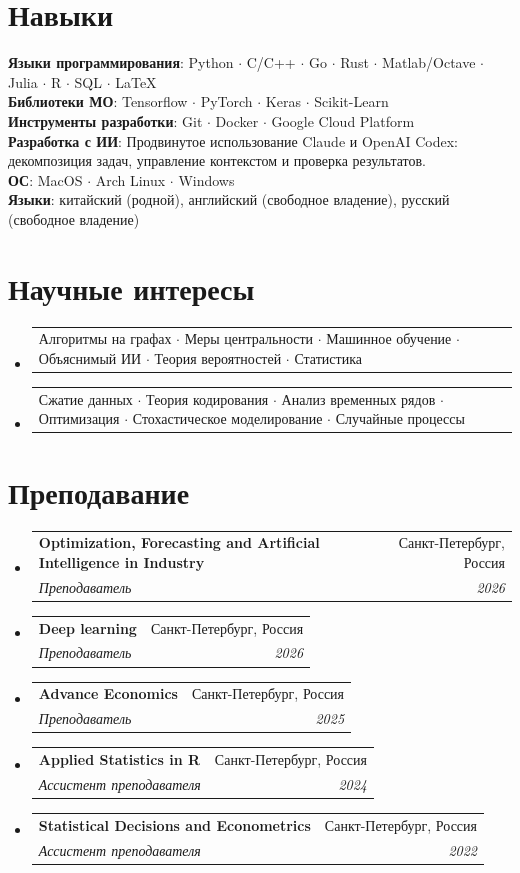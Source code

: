 \documentclass[letterpaper,10pt]{article}
\makeatletter
\newcommand{\resumeSubheading}[4]{
  \vspace{-2pt}\item
  \begin{tabular*}{0.97\textwidth}[t]{l@{\extracolsep{\fill}}r}
    \textbf{#1} & #2 \\
    \textit{\small#3} & \textit{\small #4} \\
  \end{tabular*}\vspace{-7pt}
}
\newcommand{\resumeProjectHeading}[2]{
  \item
  \begin{tabular*}{0.97\textwidth}{l@{\extracolsep{\fill}}r}
    \small#1 & #2 \\
  \end{tabular*}\vspace{-7pt}
}
\newenvironment{resumeSubHeadingList}{\begin{itemize}[leftmargin=0.15in, label={}]}{\end{itemize}}
\makeatother
\begin{document}
\section{Навыки}
\begin{itemize}[leftmargin=0.15in, label={}]
  \small{\item{
        \textbf{Языки программирования}{: Python $\cdot$ C/C++ $\cdot$ Go $\cdot$ Rust $\cdot$ Matlab/Octave $\cdot$ Julia $\cdot$ R $\cdot$ SQL $\cdot$ \LaTeX} \\
        \textbf{Библиотеки МО}{: Tensorflow $\cdot$  PyTorch $\cdot$ Keras $\cdot$  Scikit-Learn} \\
        \textbf{Инструменты разработки}{: Git $\cdot$ Docker $\cdot$  Google Cloud Platform} \\
        \textbf{Разработка с ИИ}{: Продвинутое использование Claude и OpenAI Codex: декомпозиция задач, управление контекстом и проверка результатов.} \\
        \textbf{ОС}{: MacOS $\cdot$ Arch Linux $\cdot$ Windows} \\
        \textbf{Языки}{: китайский (родной), английский (свободное владение), русский (свободное владение)}
        }}
\end{itemize}

\section{Научные интересы}
\begin{resumeSubHeadingList}
  \resumeProjectHeading{
    Алгоритмы на графах $\cdot$ Меры центральности $\cdot$ Машинное обучение
    $\cdot$ Объяснимый ИИ $\cdot$ Теория вероятностей $\cdot$ Статистика}{}
  \resumeProjectHeading{
    Сжатие данных $\cdot$ Теория кодирования $\cdot$ Анализ временных рядов $\cdot$
    Оптимизация $\cdot$ Стохастическое моделирование $\cdot$ Случайные процессы}{}
\end{resumeSubHeadingList}
\section{Преподавание}
\begin{resumeSubHeadingList}
  \resumeSubheading{Optimization, Forecasting and Artificial Intelligence in
                    Industry}{Санкт-Петербург, Россия}{Преподаватель}{2026}
  \resumeSubheading{Deep learning}{Санкт-Петербург,
                    Россия}{Преподаватель}{2026}
  \resumeSubheading{Advance Economics}{Санкт-Петербург,
                    Россия}{Преподаватель}{2025}
  \resumeSubheading{Applied Statistics in R}{Санкт-Петербург, Россия}{Ассистент
                    преподавателя}{2024}
  \resumeSubheading{Statistical Decisions and Econometrics}{Санкт-Петербург,
                    Россия}{Ассистент преподавателя}{2022}
\end{resumeSubHeadingList}
\end{document}
